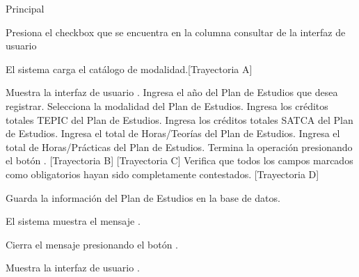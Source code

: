 \begin{UCtrayectoria}{Principal}

    \UCpaso[\UCactor] Presiona el checkbox que se encuentra en la columna consultar de la interfaz de usuario 

    \UCpaso El sistema carga el catálogo de modalidad.[Trayectoria A]


    \UCpaso Muestra la interfaz de usuario .
    \UCpaso[\UCactor] Ingresa el año del Plan de Estudios que desea registrar.
    \UCpaso[\UCactor] Selecciona la modalidad del Plan de Estudios.
    \UCpaso[\UCactor] Ingresa los créditos totales TEPIC del Plan de Estudios.
    \UCpaso[\UCactor] Ingresa los créditos totales SATCA del Plan de Estudios.
    \UCpaso[\UCactor] Ingresa el total de Horas/Teorías del Plan de Estudios.
    \UCpaso[\UCactor] Ingresa el total de Horas/Prácticas del Plan de Estudios.
    \UCpaso[\UCactor] Termina la operación presionando el botón . [Trayectoria B] [Trayectoria C]
    \UCpaso Verifica que todos los campos marcados como obligatorios hayan sido completamente contestados. [Trayectoria D]

    \UCpaso Guarda la información del Plan de Estudios en la base de datos.

    \UCpaso El sistema muestra el mensaje .

    \UCpaso[\UCactor] Cierra el mensaje presionando el botón .

    \UCpaso Muestra la interfaz de usuario .
\end{UCtrayectoria}


\begin{comment}
\begin{UCtrayectoriaA}{A}{El sistema no encuentra ningún formulario para mostrar.}
	\UCpaso No encuentra ningún formulario para mostrar.
    \UCpaso El sistema muestra el mensaje \MSGref{MSG6}{Por el momento no se puede registrar la bibliografía}.
    \UCpaso[\UCactor] Cierra el mensaje presionando el botón \IUbutton{Aceptar}.
    \UCpaso Continua en el paso 1 de la trayectoria principal del \UCref{CU1}.
\end{UCtrayectoriaA}
\end{comment}

